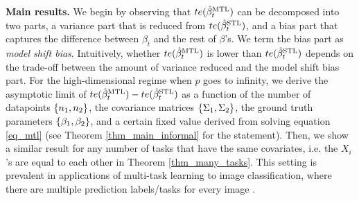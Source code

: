 



	\textbf{Main results.}
	We begin by observing that $te(\hat{\beta}_t^{\text{MTL}})$ can be decomposed into two parts, a variance part that is reduced from $te(\hat{\beta}_t^{\text{STL}})$, and a bias part that captures the difference between $\beta_t$ and the rest of $\beta$'s.
	We term the bias part as \textit{model shift bias}.
	Intuitively, whether $te(\hat{\beta}_t^{\text{MTL}})$ is lower than $te(\hat{\beta}_t^{\text{STL}})$ depends on the trade-off between the amount of variance reduced and the model shift bias part.
	For the high-dimensional regime when $p$ goes to infinity, we derive the asymptotic limit of $te(\hat{\beta}_t^{\text{MTL}}) - te(\hat{\beta}_t^{\text{STL}})$ as a function of the number of datapoints $\{n_1, n_2\}$, the covariance matrices $\{\Sigma_1, \Sigma_2\}$, the ground truth parameters $\{\beta_1, \beta_2\}$, and a certain fixed value derived from solving equation \eqref{eq_mtl} (see Theorem \ref{thm_main_informal} for the statement).
	Then, we show a similar result for any number of tasks that have the same covariates, i.e. the $X_i$'s are equal to each other in Theorem \ref{thm_many_tasks}.
	This setting is prevalent in applications of multi-task learning to image classification, where there are multiple prediction labels/tasks for every image \cite{chexnet17,EA20}.

